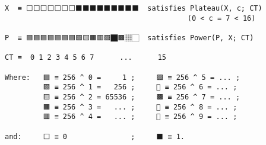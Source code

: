 \documentclass[varwidth=\maxdimen,margin=0.5cm,multi={verbatim}]{standalone}
\begin{document}
\begin{verbatim}
X  ≡ ⬜⬜⬜⬜⬜⬜⬜⬛⬛⬛⬛⬛⬛⬛⬛⬛  satisfies Plateau(X, c; CT)
                                           (0 < c = 7 < 16)

P  ≡ 🟦🟦🟦🟦🟦🟦🟦🟩🟨🟧🟥🟪🏿🟫🏽🏻  satisfies Power(P, X; CT)

CT ≡  0 1 2 3 4 5 6 7      ...      15

Where:   🟦 ≡ 256 ^ 0 =     1 ;     🟪 ≡ 256 ^ 5 = ... ;
         🟩 ≡ 256 ^ 1 =   256 ;     🏿 ≡ 256 ^ 6 = ... ;
         🟨 ≡ 256 ^ 2 = 65536 ;     🟫 ≡ 256 ^ 7 = ... ;
         🟧 ≡ 256 ^ 3 =   ... ;     🏽 ≡ 256 ^ 8 = ... ;
         🟥 ≡ 256 ^ 4 =   ... ;     🏻 ≡ 256 ^ 9 = ... ;
       
and:     ⬜ ≡ 0               ;     ⬛ ≡ 1.
\end{verbatim}
\end{document}
